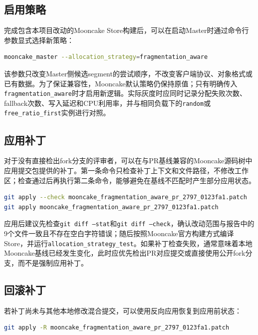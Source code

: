 \documentclass[UTF8,zihao=-4,a4paper]{ctexart}
\newcommand{\artifact}[1]{\texttt{#1}}
\newcommand{\baseline}{\texttt{free\_ratio\_first}}
\begin{document}
\subsection{启用策略}

完成包含本项目改动的Mooncake Store构建后，可以在启动Master时通过命令行参数显式选择新策略：

\begin{lstlisting}[language=bash]
mooncake_master --allocation_strategy=fragmentation_aware
\end{lstlisting}

该参数只改变Master侧候选segment的尝试顺序，不改变客户端协议、对象格式或已有数据。为了保证兼容性，Mooncake默认策略仍保持原值；只有明确传入\artifact{fragmentation\_aware}时才启用新逻辑。实际灰度时应同时记录分配失败次数、fallback次数、写入延迟和CPU利用率，并与相同负载下的\artifact{random}或\baseline{}实例进行对照。

\subsection{应用补丁}

对于没有直接检出fork分支的评审者，可以在与PR基线兼容的Mooncake源码树中应用提交包提供的补丁。第一条命令只检查补丁上下文和文件路径，不修改工作区；检查通过后再执行第二条命令，能够避免在基线不匹配时产生部分应用状态。

\begin{lstlisting}[language=bash]
git apply --check mooncake_fragmentation_aware_pr_2797_0123fa1.patch
git apply mooncake_fragmentation_aware_pr_2797_0123fa1.patch
\end{lstlisting}

应用后建议先检查\artifact{git diff --stat}和\artifact{git diff --check}，确认改动范围与报告中的9个文件一致且不存在空白字符错误；随后按照Mooncake官方构建方式编译Store，并运行\artifact{allocation\_strategy\_test}。如果补丁检查失败，通常意味着本地Mooncake基线已经发生变化，此时应优先检出PR对应提交或直接使用公开fork分支，而不是强制应用补丁。

\subsection{回滚补丁}

若补丁尚未与其他本地修改混合提交，可以使用反向应用恢复到应用前状态：

\begin{lstlisting}[language=bash]
git apply -R mooncake_fragmentation_aware_pr_2797_0123fa1.patch
\end{lstlisting}
\end{document}
